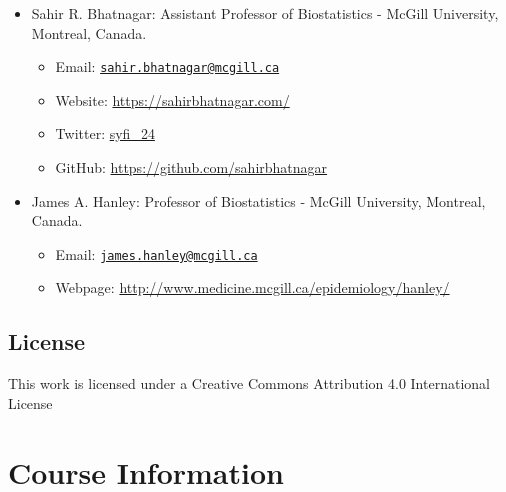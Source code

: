 \documentclass[]{book}
\providecommand{\tightlist}{%
  \setlength{\itemsep}{0pt}\setlength{\parskip}{0pt}}
\providecommand{\tightlist}{%
  \setlength{\itemsep}{0pt}\setlength{\parskip}{0pt}}
\theoremstyle{definition}
\theoremstyle{definition}
\theoremstyle{definition}
\theoremstyle{remark}
\begin{document}
\begin{itemize}
\tightlist
\item
  Sahir R. Bhatnagar: Assistant Professor of Biostatistics - McGill
  University, Montreal, Canada.

  \begin{itemize}
  \tightlist
  \item
    Email:
    \href{mailto:sahir.bhatnagar@mcgill.ca}{\nolinkurl{sahir.bhatnagar@mcgill.ca}}
  \item
    Website: \url{https://sahirbhatnagar.com/}\\
  \item
    Twitter: \href{https://twitter.com/syfi_24}{syfi\_24}\\
  \item
    GitHub: \url{https://github.com/sahirbhatnagar}\\
  \end{itemize}
\item
  James A. Hanley: Professor of Biostatistics - McGill University,
  Montreal, Canada.

  \begin{itemize}
  \tightlist
  \item
    Email:
    \href{mailto:james.hanley@mcgill.ca}{\nolinkurl{james.hanley@mcgill.ca}}\\
  \item
    Webpage: \url{http://www.medicine.mcgill.ca/epidemiology/hanley/}
  \end{itemize}
\end{itemize}

\section*{License}\label{license}

This work is licensed under a Creative Commons Attribution 4.0
International License

\chapter*{Course Information}\label{course-information}
\end{document}
